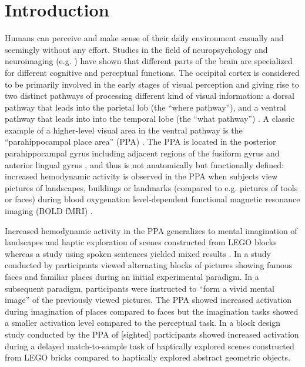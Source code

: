 \documentclass[english]{article}
\begin{document}
\section{Introduction}


Humans can perceive and make sense of their daily environment casually and
seemingly without any effort.
%
Studies in the field of neuropsychology and neuroimaging (e.g.
\citep{penfield1950cerebral, fox1984noninvasive}) have shown that different
parts of the brain are specialized for different cognitive and perceptual
functions.
The occipital cortex is considered to be primarily involved in the early stages
of visual perception and giving rise to two distinct pathways of processing
different kind of visual information:
a dorsal pathway that leads into the parietal lob (the ``where pathway''), and a
ventral pathway that leads into into the temporal lobe (the ``what pathway'')
\citep{goodale1992separate, mishkin1982contribution}.
A classic example of a higher-level visual area in the ventral pathway is the
``parahippocampal place area'' (PPA) \citep{epstein1998ppa,
epstein1999parahippocampal}.
The PPA is located in the posterior parahippocampal gyrus including adjacent
regions of the fusiform gyrus and anterior lingual gyrus
\citep{epstein2008parahippocampal}, and thus is not anatomically but
functionally defined:
increased hemodynamic activity is observed in the PPA when subjects view
pictures of landscapes, buildings or landmarks (compared to e.g. pictures of
tools or faces) during blood oxygenation level-dependent functional magnetic
resonance imaging (BOLD fMRI) \citep{aguirre1998area, epstein2014neural,
epstein1998ppa, troiani2012object}.

Increased hemodynamic activity in the PPA generalizes to mental imagination of
landscapes \citep{ocraven2000mental} and haptic exploration of scenes
constructed from LEGO blocks \citep{wolbers2011modality} whereas a study using
spoken sentences yielded mixed results \citep{aziz2008modulation}.
In a study conducted by \cite{ocraven2000mental} participants viewed alternating
blocks of pictures showing famous faces and familiar places during an initial
experimental paradigm.
In a subsequent paradigm, participants were instructed to ``form a vivid mental
image'' of the previously viewed pictures.
The PPA showed increased activation during imagination of places compared to
faces but the imagination tasks showed a smaller activation level compared to
the perceptual task.
In a block design study conducted by \cite{wolbers2011modality} the PPA of
[sighted] participants showed increased activation during a delayed
match-to-sample task of haptically explored scenes constructed from LEGO bricks
compared to haptically explored abstract geometric objects.
\end{document}
